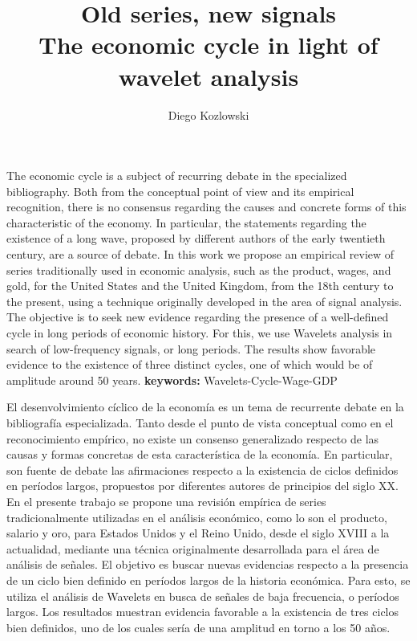 \documentclass[a4paper,10cpi]{article}
\title{{\fontfamily{ptm}\selectfont \Large Old series, new signals \\
	  The economic cycle in light of wavelet analysis }}
\author[1]{Diego Kozlowski}
\affil[1]{Licenciado en Econom\'{i}a por la FCE-UBA. Maestrando en Data Mining\par
	Master in Data Mining \& Knowledge Discovery, FCEN-UBA \par
	Pabell\'{o}n I - Ciudad Universitaria, Buenos Aires, Argentina, cp: 1428 \par 
	dkozlowski@dc.uba.ar}
\date{}                     %
\renewenvironment{abstract}{
	\vspace*{\fill}
	\begin{center}%
		\bfseries\abstractname
\end{center}}%
{\vfill}
\begin{document}
	
	
	\maketitle
	
	
	\begin{abstract}
		The economic cycle is a subject of recurring debate in the specialized bibliography. Both from the conceptual point of view and its empirical recognition, there is no consensus regarding the causes and concrete forms of this characteristic of the economy. In particular, the statements regarding the existence of a long wave, proposed by different authors of the early twentieth century, are a source of debate. In this work we propose an empirical review of series traditionally used in economic analysis, such as the product, wages, and gold, for the United States and the United Kingdom, from the 18th century to the present, using a technique originally developed in the area of ​​signal analysis. The objective is to seek new evidence regarding the presence of a well-defined cycle in long periods of economic history. For this, we use Wavelets analysis in search of low-frequency signals, or long periods. The results show favorable evidence to the existence of three distinct cycles, one of which would be of amplitude around 50 years.
	\end{abstract}
	\textbf{keywords:} Wavelets-Cycle-Wage-GDP
	\medskip
	
	
	
	\justify
	
	\begin{abstract}
		El desenvolvimiento cíclico de la economía es un tema de recurrente debate en la bibliografía especializada. Tanto desde el punto de vista conceptual como en el reconocimiento empírico, no existe un consenso generalizado respecto de las causas y formas concretas de esta característica de la economía. En particular, son fuente de debate las afirmaciones respecto a la existencia de ciclos definidos en períodos largos, propuestos por diferentes autores de principios del siglo XX. En el presente trabajo se propone una revisión empírica de series tradicionalmente utilizadas en el análisis económico, como lo son el producto, salario y oro, para Estados Unidos y el Reino Unido, desde el siglo XVIII a la actualidad, mediante una técnica originalmente desarrollada para el área de análisis de señales. El objetivo es buscar nuevas evidencias respecto a la presencia de un ciclo bien definido en períodos largos de la historia económica. Para esto, se utiliza el análisis de Wavelets en busca de señales de baja frecuencia, o períodos largos. Los resultados muestran evidencia favorable a la existencia de tres ciclos bien definidos, uno de los cuales sería de una amplitud en torno a los 50 años.
	\end{abstract}
\end{document}
